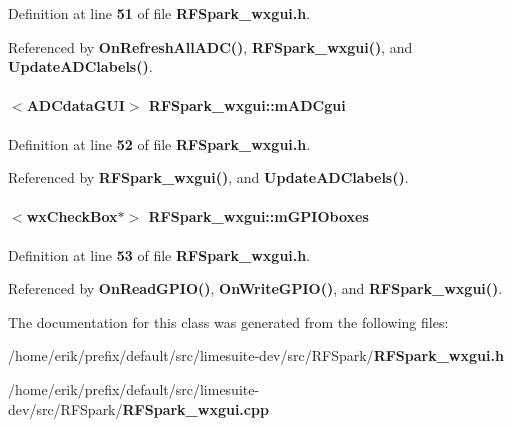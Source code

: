 Definition at line {\bf 51} of file {\bf R\+F\+Spark\+\_\+wxgui.\+h}.



Referenced by {\bf On\+Refresh\+All\+A\+D\+C()}, {\bf R\+F\+Spark\+\_\+wxgui()}, and {\bf Update\+A\+D\+Clabels()}.

\paragraph[{m\+A\+D\+Cgui}]{$<${\bf A\+D\+Cdata\+G\+UI}$>$ R\+F\+Spark\+\_\+wxgui\+::m\+A\+D\+Cgui\hspace{0.3cm}{\ttfamily [protected]}}\label{classRFSpark__wxgui_a3713edaf262bcd9bdf12428e64f48740}


Definition at line {\bf 52} of file {\bf R\+F\+Spark\+\_\+wxgui.\+h}.



Referenced by {\bf R\+F\+Spark\+\_\+wxgui()}, and {\bf Update\+A\+D\+Clabels()}.

\paragraph[{m\+G\+P\+I\+Oboxes}]{$<$wx\+Check\+Box$\ast$$>$ R\+F\+Spark\+\_\+wxgui\+::m\+G\+P\+I\+Oboxes\hspace{0.3cm}{\ttfamily [protected]}}\label{classRFSpark__wxgui_acf67292b2dfcdbc984b6c6a19cb99060}


Definition at line {\bf 53} of file {\bf R\+F\+Spark\+\_\+wxgui.\+h}.



Referenced by {\bf On\+Read\+G\+P\+I\+O()}, {\bf On\+Write\+G\+P\+I\+O()}, and {\bf R\+F\+Spark\+\_\+wxgui()}.



The documentation for this class was generated from the following files\+:\begin{DoxyCompactItemize}
\item 
/home/erik/prefix/default/src/limesuite-\/dev/src/\+R\+F\+Spark/{\bf R\+F\+Spark\+\_\+wxgui.\+h}\item 
/home/erik/prefix/default/src/limesuite-\/dev/src/\+R\+F\+Spark/{\bf R\+F\+Spark\+\_\+wxgui.\+cpp}\end{DoxyCompactItemize}
